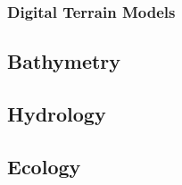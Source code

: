 \documentclass{article}
\begin{document}
\subsubsection{Digital Terrain Models}




\subsection{Bathymetry}



\subsection{Hydrology}



\subsection{Ecology}




\newpage
{}
\fancyfoot[C]{}
\thispagestyle{fancy}
\end{document}
